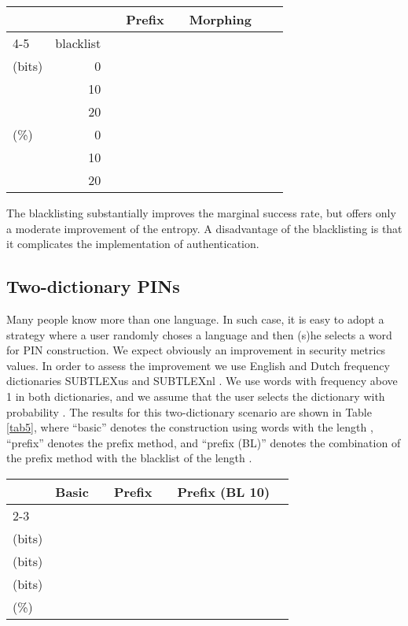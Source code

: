 \documentclass[a4paper, 11pt]{article}
\newcommand{\ra}[1]{\renewcommand{\arraystretch}{#1}}
\begin{document}
{\begin{table*}[h]\centering
\ra{1.2}
\begin{tabular}{@{}lrrrrrrrrr@{}}\toprule
 &&& \multicolumn{2}{c}{Prefix} &\phantom{a} & \multicolumn{2}{c}{Morphing} \\
   \cmidrule{4-5} \cmidrule{7-8}
 & blacklist &\phantom{a} &  &  &&  &  \\ 
\midrule
 (bits) 
  & 0 &&  &  &&  &  \\
  &10 &&  &  &&  &  \\
  &20 &&  &  &&  &  \\
\midrule
 (\%) 
  &0  &&  &  &&  &  \\
  &10 &&  &  &&  &  \\
  &20 &&  &  &&  &  \\
\bottomrule
\end{tabular}
\caption{Combination of PIN blacklist and the prefix/morphing method}\label{tab4}
\end{table*}

The blacklisting substantially improves the marginal success rate, but offers only a moderate
improvement of the entropy. A disadvantage of the blacklisting is that it complicates the
implementation of authentication.

\subsection{Two-dictionary PINs}

Many people know more than one language. In such case, it is easy to adopt a strategy where a user
randomly choses a language and then (s)he selects a word for PIN construction. We expect obviously
an improvement in security metrics values. In order to assess the improvement we use English 
and Dutch frequency dictionaries SUBTLEXus and SUBTLEXnl \cite{SUBTLEXnl}. We use words with
frequency above 1 in both dictionaries, and we assume that the user selects the dictionary with
probability . The results for this two-dictionary scenario are shown 
in Table \ref{tab5}, where ``basic'' denotes the construction using words with the length , 
``prefix'' denotes the prefix method, and ``prefix (BL)'' denotes the combination of the prefix 
method with the blacklist of the length .

\begin{table*}[h]\centering
\ra{1.2}
\begin{tabular}{@{}lrrrrrrrrr@{}}\toprule
 & \multicolumn{2}{c}{Basic} &\phantom{a} & \multicolumn{2}{c}{Prefix} &\phantom{a} & \multicolumn{2}{c}{Prefix (BL 10)} \\
   \cmidrule{2-3} \cmidrule{5-6} \cmidrule{8-9}
 &  &  &&  &  &&  &  \\ 
\midrule
 (bits)              &   &   &&  &  &&  &  \\
  (bits)        &   &   &&  &  &&  &  \\
 (bits) &   &   &&  &   &&  &  \\
 (\%)        &  &  &&  &   &&  &  \\
\bottomrule
\end{tabular}
\caption{Security metrics for two-dictionary scenario}\label{tab5}
\end{table*}

}
\end{document}
